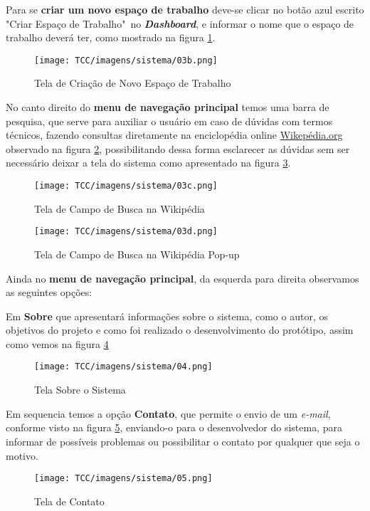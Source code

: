 \begin{anexosenv}
Para se \textbf{criar um novo espaço de trabalho} deve-se clicar no botão azul escrito "Criar Espaço de Trabalho"\ no \textit{\textbf{Dashboard}}, e informar o nome que o espaço de trabalho deverá ter, como mostrado na figura \ref{tela-new-workspace}.
\begin{figure}[H]
     \centering
     \texttt{[image: TCC/imagens/sistema/03b.png]}
     \caption{Tela de Criação de Novo Espaço de Trabalho}
     \label{tela-new-workspace}
\end{figure}

No canto direito do \textbf{menu de navegação principal} temos uma barra de pesquisa, que serve para auxiliar o usuário em caso de dúvidas com termos técnicos, fazendo consultas diretamente na enciclopédia online \url{Wikepédia.org} observado na figura \ref{tela-wiki}, possibilitando dessa forma esclarecer as dúvidas sem ser necessário deixar a tela do sistema como apresentado na figura \ref{tela-popup}.
\begin{figure}[H]
     \centering
     \texttt{[image: TCC/imagens/sistema/03c.png]}
     \caption{Tela de Campo de Busca na Wikipédia}
     \label{tela-wiki}
\end{figure}

\begin{figure}[H]
     \centering
     \texttt{[image: TCC/imagens/sistema/03d.png]}
     \caption{Tela de Campo de Busca na Wikipédia Pop-up}
     \label{tela-popup}
\end{figure}

Ainda no \textbf{menu de navegação principal}, da esquerda para direita observamos as seguintes opções:

Em \textbf{Sobre} que apresentará informações sobre o sistema, como o autor, os objetivos do projeto e como foi realizado o desenvolvimento do protótipo, assim como vemos na figura \ref{tela-sobre}
\begin{figure}[H]
     \centering
     \texttt{[image: TCC/imagens/sistema/04.png]}
     \caption{Tela Sobre o Sistema}
     \label{tela-sobre}
\end{figure}

Em sequencia temos a opção \textbf{Contato}, que permite o envio de um \textit{e-mail},  conforme visto na figura \ref{tela-contato}, enviando-o para o desenvolvedor do sistema, para informar de possíveis problemas ou possibilitar o contato por qualquer que seja o motivo.
\begin{figure}[H]
     \centering
     \texttt{[image: TCC/imagens/sistema/05.png]}
     \caption{Tela de Contato}
     \label{tela-contato}
\end{figure}


\end{anexosenv}

